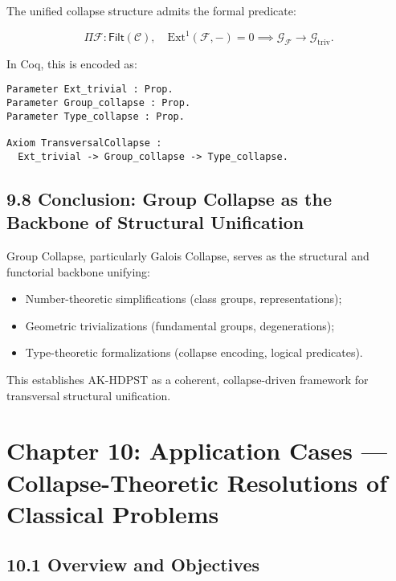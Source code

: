\documentclass[11pt]{article}
\begin{document}
The unified collapse structure admits the formal predicate:

\[
\Pi \mathcal{F} : \mathsf{Filt}(\mathcal{C}), \quad \mathrm{Ext}^1(\mathcal{F}, -) = 0 \implies \mathcal{G}_{\mathcal{F}} \longrightarrow \mathcal{G}_{\mathrm{triv}}.
\]

In Coq, this is encoded as:

\begin{lstlisting}[language=Coq]
Parameter Ext_trivial : Prop.
Parameter Group_collapse : Prop.
Parameter Type_collapse : Prop.

Axiom TransversalCollapse :
  Ext_trivial -> Group_collapse -> Type_collapse.
\end{lstlisting}

\subsection*{9.8 Conclusion: Group Collapse as the Backbone of Structural Unification}

Group Collapse, particularly Galois Collapse, serves as the structural and functorial backbone unifying:

\begin{itemize}
    \item Number-theoretic simplifications (class groups, representations);
    \item Geometric trivializations (fundamental groups, degenerations);
    \item Type-theoretic formalizations (collapse encoding, logical predicates).
\end{itemize}

This establishes AK-HDPST as a coherent, collapse-driven framework for transversal structural unification.



\section{Chapter 10: Application Cases — Collapse-Theoretic Resolutions of Classical Problems}

\subsection*{10.1 Overview and Objectives}
\end{document}
